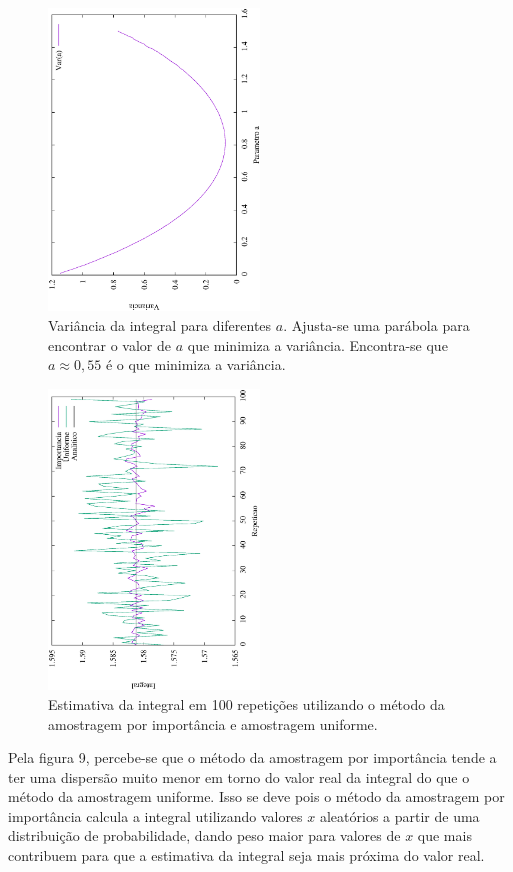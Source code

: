 \documentclass[brazilian, 12pt, a4paper, final]{article}
\begin{document}
\begin{figure}[htbp]
  \centering
  \includegraphics[width=0.5\textwidth,angle=-90]{Q5/VarQ5.eps}
  \caption{Variância da integral para diferentes $a$. Ajusta-se uma parábola para encontrar o valor de $a$ que minimiza a variância. Encontra-se que $a\approx0,55$ é o que minimiza a variância.}
\end{figure} 

\begin{figure}[htbp]
  \centering
  \includegraphics[width=0.5\textwidth,angle=-90]{Q5/Q5comp.eps}
  \caption{Estimativa da integral em 100 repetições utilizando o método da amostragem por importância e amostragem uniforme.}
\end{figure} 

Pela figura 9, percebe-se que o método da amostragem por importância tende a ter uma dispersão muito menor em torno do valor real da integral do que o método da amostragem uniforme. Isso se deve pois o método da amostragem por importância calcula a integral utilizando valores $x$ aleatórios a partir de uma distribuição de probabilidade, dando peso maior para valores de $x$ que mais contribuem para que a estimativa da integral seja mais próxima do valor real.
\end{document}

